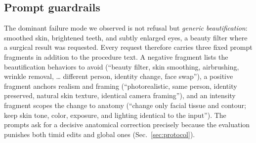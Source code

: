 \subsection{Prompt guardrails}
\label{sec:guardrails}

The dominant failure mode we observed is not refusal but \emph{generic
beautification}: smoothed skin, brightened teeth, and subtly enlarged eyes, a
beauty filter where a surgical result was requested. Every request therefore carries three
fixed prompt fragments in addition to the procedure text. A negative fragment lists
the beautification behaviors to avoid (``beauty filter, skin smoothing,
airbrushing, wrinkle removal, \ldots{} different person, identity change, face
swap''), a positive fragment anchors realism and framing (``photorealistic, same
person, identity preserved, natural skin texture, identical camera framing''), and
an intensity fragment scopes the change to anatomy (``change only facial tissue and
contour; keep skin tone, color, exposure, and lighting identical to the input'').
The prompts ask for a decisive anatomical correction precisely because the
evaluation punishes both timid edits and global ones (Sec.~\ref{sec:protocol}).
